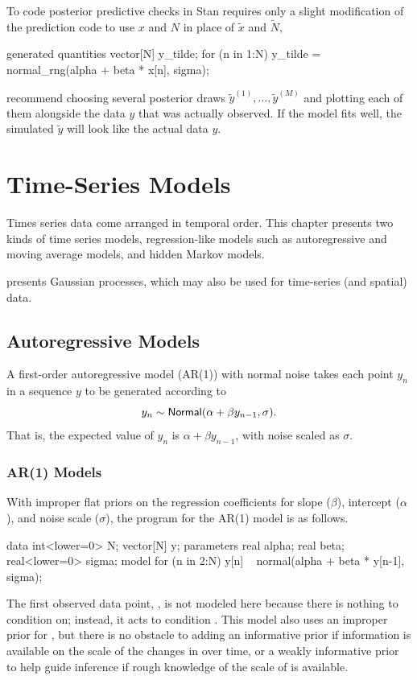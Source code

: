 To code posterior predictive checks in Stan requires only a slight
modification of the prediction code to use $x$ and $N$ in place of
$\tilde{x}$ and $\tilde{N}$,
%
\begin{stancode}
generated quantities {
  vector[N] y_tilde;
  for (n in 1:N)
    y_tilde = normal_rng(alpha + beta * x[n], sigma);
}
\end{stancode}
%
\cite{GelmanEtAl:2013} recommend choosing several posterior draws
$\tilde{y}^{(1)}, \ldots, \tilde{y}^{(M)}$ and plotting each of them
alongside the data $y$ that was actually observed.  If the model fits
well, the simulated $\tilde{y}$ will look like the actual data $y$.




\chapter{Time-Series Models}

\noindent
Times series data come arranged in temporal order.  This chapter
presents two kinds of time series models, regression-like models such
as autoregressive and moving average models, and hidden Markov models. 

 presents Gaussian processes, which may
also be used for time-series (and spatial) data.


\section{Autoregressive Models}

A first-order autoregressive model (AR(1)) with normal noise takes
each point $y_n$ in a sequence $y$ to be generated according to
%
\[
y_n \sim \distro{Normal}(\alpha + \beta y_{n-1}, \sigma).
\]
%
That is, the expected value of $y_n$ is $\alpha + \beta y_{n-1}$, with
noise scaled as $\sigma$.

\subsection{AR(1) Models}

With improper flat priors on the regression coefficients for slope
($\beta$), intercept ($\alpha$), and noise scale ($\sigma$),
the \Stan program for the AR(1) model is as follows.
%
\begin{stancode}
data {
  int<lower=0> N;
  vector[N] y;
}
parameters {
  real alpha;
  real beta;
  real<lower=0> sigma;
}
model {
  for (n in 2:N)
    y[n] ~ normal(alpha + beta * y[n-1], sigma);
}
\end{stancode}
%
The first observed data point, , is not modeled here
because there is nothing to condition on; instead, it acts to
condition .  This model also uses an improper prior for
, but there is no obstacle to adding an informative prior
if information is available on the scale of the changes in 
over time, or a weakly informative prior to help guide inference if
rough knowledge of the scale of  is available.

